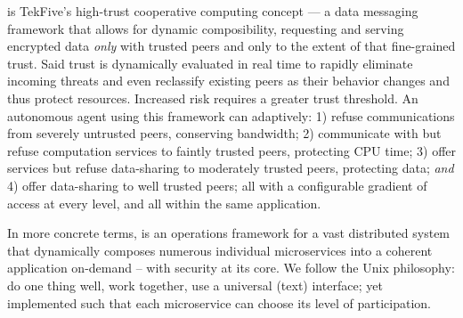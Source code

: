 %
%
%

\textbf{\projectName}is TekFive's high-trust cooperative computing concept --- a data messaging framework that allows for dynamic composibility, requesting and serving encrypted data \textit{only} with trusted peers and only to the extent of that fine-grained trust.
Said trust is dynamically evaluated in real time to rapidly eliminate incoming threats and even reclassify existing peers as their behavior changes and thus protect resources.
Increased risk requires a greater trust threshold.
An autonomous agent using this framework can adaptively: 1) refuse communications from severely untrusted peers, conserving bandwidth; 2) communicate with but refuse computation services to faintly trusted peers, protecting CPU time; 3) offer services but refuse data-sharing to moderately trusted peers, protecting data; \textit{and} 4) offer data-sharing to well trusted peers; all with a configurable gradient of access at every level, and all within the same application.

In more concrete terms, \projectName is an operations framework for a vast distributed system that dynamically composes numerous individual microservices into a coherent application on-demand -- with security at its core.
We follow the Unix philosophy: do one thing well, work together, use a universal (text) interface; yet implemented such that each microservice can choose its level of participation.
